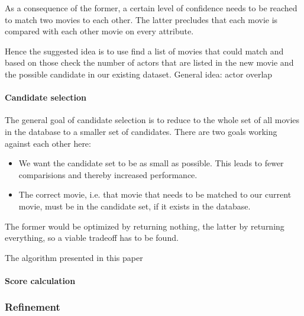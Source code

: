As a consequence of the former, a certain level of confidence needs to be reached to match two movies to each other. The latter precludes that each movie is compared with each other movie on every attribute.

Hence the suggested idea is to use find a list of movies that could match and based on those check the number of actors that are listed in the new movie and the possible candidate in our existing dataset.
General idea: actor overlap

\paragraph{Candidate selection}

The general goal of candidate selection is to reduce to the whole set of all movies in the database to a smaller set of candidates.
There are two goals working against each other here:
\begin{itemize}
	\item We want the candidate set to be as small as possible. This leads to fewer comparisions and thereby increased performance.
	\item The correct movie, i.e. that movie that needs to be matched to our current movie, must be in the candidate set, if it exists in the database.
\end{itemize}
The former would be optimized by returning nothing, the latter by returning everything, so a viable tradeoff has to be found.

The algorithm presented in this paper 
\paragraph{Score calculation}

\subsubsection{Refinement}